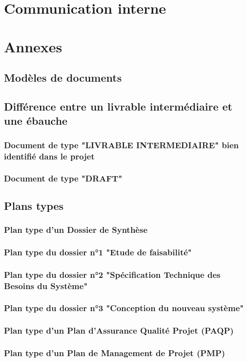\section{Communication interne}
\section{Annexes}
  \subsection{Modèles de documents}
  \subsection{Différence entre un livrable intermédiaire et une ébauche}     
    \subsubsection{Document de type "LIVRABLE INTERMEDIAIRE" bien identifié dans le projet}
    \subsubsection{Document de type "DRAFT"}
  \subsection{Plans types}     
    \subsubsection{Plan type d'un Dossier de Synthèse}
    \subsubsection{Plan type du dossier n°1 "Etude de faisabilité"}
    \subsubsection{Plan type du dossier n°2 "Spécification Technique des Besoins du Système"}
    \subsubsection{Plan type du dossier n°3 "Conception du nouveau système"}
    \subsubsection{Plan type d'un Plan d'Assurance Qualité Projet (PAQP)}
    \subsubsection{Plan type d'un Plan de Management de Projet (PMP)}